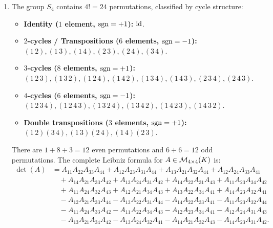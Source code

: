 \begin{exercisesolution*}
\label{sol:symmetric_group_s4_and_alternating}
\begin{enumerate}[label=\textbf{(\alph*)}]
    \item The group $S_4$ contains $4! = 24$ permutations, classified by cycle structure:
    \begin{itemize}
        \item \textbf{Identity ($1$ element, $\operatorname{sgn} = +1$):} $\operatorname{id}$.
        \item \textbf{$2$-cycles / Transpositions ($6$ elements, $\operatorname{sgn} = -1$):}
        $(1\,2), (1\,3), (1\,4), (2\,3), (2\,4), (3\,4)$.
        \item \textbf{$3$-cycles ($8$ elements, $\operatorname{sgn} = +1$):} \\
        $(1\,2\,3), (1\,3\,2), (1\,2\,4), (1\,4\,2), (1\,3\,4), (1\,4\,3), (2\,3\,4), (2\,4\,3)$.
        \item \textbf{$4$-cycles ($6$ elements, $\operatorname{sgn} = -1$):}
        $(1\,2\,3\,4), (1\,2\,4\,3), (1\,3\,2\,4), (1\,3\,4\,2), (1\,4\,2\,3), (1\,4\,3\,2)$.
        \item \textbf{Double transpositions ($3$ elements, $\operatorname{sgn} = +1$):}
        $(1\,2)(3\,4), (1\,3)(2\,4), (1\,4)(2\,3)$.
    \end{itemize}
    There are $1 + 8 + 3 = 12$ even permutations and $6 + 6 = 12$ odd permutations.
    The complete Leibniz formula for $A \in \mathcal{M}_{4 \times 4}(K)$ is:
    \begin{align*}
    \det(A) &= A_{11}A_{22}A_{33}A_{44} + A_{12}A_{23}A_{31}A_{44} + A_{13}A_{21}A_{32}A_{44} + A_{12}A_{24}A_{33}A_{41} \\
    &\quad + A_{14}A_{21}A_{33}A_{42} + A_{13}A_{24}A_{31}A_{42} + A_{14}A_{22}A_{31}A_{43} + A_{11}A_{23}A_{34}A_{42} \\
    &\quad + A_{11}A_{24}A_{32}A_{43} + A_{12}A_{21}A_{34}A_{43} + A_{13}A_{22}A_{34}A_{41} + A_{14}A_{23}A_{32}A_{41} \\
    &\quad - A_{12}A_{21}A_{33}A_{44} - A_{13}A_{22}A_{31}A_{44} - A_{14}A_{22}A_{33}A_{41} - A_{11}A_{23}A_{32}A_{44} \\
    &\quad - A_{11}A_{24}A_{33}A_{42} - A_{11}A_{22}A_{34}A_{43} - A_{12}A_{23}A_{34}A_{41} - A_{12}A_{24}A_{31}A_{43} \\
    &\quad - A_{13}A_{21}A_{34}A_{42} - A_{13}A_{24}A_{32}A_{41} - A_{14}A_{21}A_{32}A_{43} - A_{14}A_{23}A_{31}A_{42}.
    \end{align*}


\end{enumerate}
\end{exercisesolution*}
